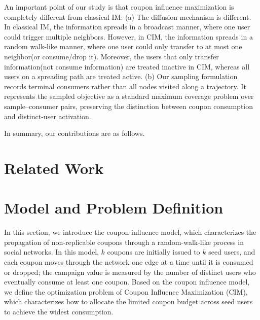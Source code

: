 \documentclass[sigconf]{acmart}
\begin{document}
An important point of our study is that coupon influence maximization is
completely different from classical IM:
(a) The diffusion mechanism is different. In classical IM, the information spreads in a broadcast manner, where one user could trigger multiple neighbors. However, in CIM, the information spreads in a random walk-like manner, where one user could only transfer to at most one neighbor(or consume/drop it). Moreover, the users that only transfer information(not consume information) are treated inactive in CIM, whereas all users on a spreading path are treated active. (b) Our sampling formulation records terminal consumers rather than all nodes visited along a trajectory. It represents the sampled objective as a standard maximum coverage problem over sample--consumer pairs, preserving the distinction between coupon consumption and distinct-user activation.



In summary, our contributions are as follows.


\section{Related Work}
\label{sec:related}




\section{Model and Problem Definition}
\label{sec:model}

In this section, we introduce the coupon influence model, which
characterizes the propagation of non-replicable coupons through a
random-walk-like process in social networks.
In this model, $k$ coupons are initially issued to $k$ seed users, and
each coupon moves through the network one edge at a time until it is
consumed or dropped; the campaign value is measured by the number of
distinct users who eventually consume at least one coupon.
Based on the coupon influence model, we define the optimization
problem of Coupon Influence Maximization (CIM), which characterizes
how to allocate the limited coupon budget across seed users to
achieve the widest consumption.
\end{document}
